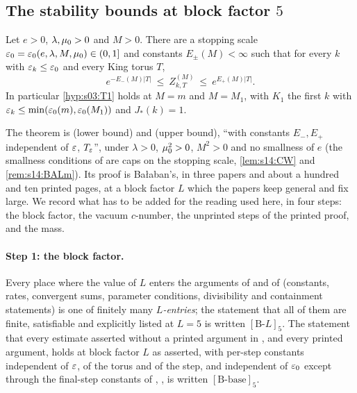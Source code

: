 \subsection{The stability bounds at block factor $5$}\label{ssec:a06:T1}

\begin{theorem}\label{thm:a06:T1}
Let $e>0$, $\lambda,\mu_0>0$ and $M>0$. There are a stopping scale $\varepsilon_0=\varepsilon_0(e,\lambda,M,\mu_0)\in(0,1]$ and constants $E_\pm(M)<\infty$ such that for every $k$ with $\varepsilon_k\le\varepsilon_0$ and every King torus $T$,
\[
e^{-E_-(M)|T|}\ \le\ Z^{(M)}_{k,T}\ \le\ e^{E_+(M)|T|}.
\]
In particular \cref{hyp:s03:T1} holds at $M=m$ and $M=M_1$, with $K_1$ the first $k$ with $\varepsilon_k\le\min(\varepsilon_0(m),\varepsilon_0(M_1))$ and $J_*(k)=1$.
\end{theorem}

The theorem is \cite[(1.14)]{Ba1} (lower bound) and \cite[(1.3)]{Ba2} (upper bound), ``with constants $E_-,E_+$ independent of $\varepsilon$, $T_{\varepsilon}$'', under $\lambda>0$, $\mu_0^2>0$, $M^2>0$ and no smallness of $e$ (the smallness conditions of \cite{Ba1,Ba2,Ba3,Ba4} are caps on the stopping scale, \cref{lem:s14:CW} and \cref{rem:s14:BALm}). Its proof is Ba{\l}aban's, in three papers and about a hundred and ten printed pages, at a block factor $L$ which the papers keep general and fix large. We record what has to be added for the reading used here, in four steps: the block factor, the vacuum $c$-number, the unprinted steps of the printed proof, and the mass.

\paragraph{Step 1: the block factor.} Every place where the value of $L$ enters the arguments of \cite{Ba1,Ba2,Ba3} and of \cite[Thm.~3.1]{K1} (constants, rates, convergent sums, parameter conditions, divisibility and containment statements) is one of finitely many \emph{$L$-entries}; the statement that all of them are finite, satisfiable and explicitly listed at $L=5$ is written $[\mathrm B\text{-}L]_5$. The statement that every estimate asserted without a printed argument in \cite{Ba1,Ba2,Ba3}, and every printed argument, holds at block factor $L$ as asserted, with per-step constants independent of $\varepsilon$, of the torus and of the step, and independent of $\varepsilon_0$ except through the final-step constants of \cite[(3.67)--(3.68)]{Ba1}, \cite[(2.116)--(2.118)]{Ba2}, is written $[\mathrm B\text{-base}]_5$.

